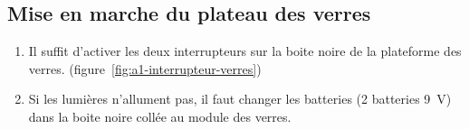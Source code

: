 \subsection{Mise en marche du plateau des verres}

\begin{enumerate}
    \item Il suffit d’activer les deux interrupteurs sur la boite noire de la plateforme des verres. (figure~\ref{fig:a1-interrupteur-verres})
    \item Si les lumières n’allument pas, il faut changer les batteries (2 batteries 9~V) dans la boite noire collée au module des verres.
\end{enumerate}

\begin{figure}[h!]
    \centering


\end{figure}
